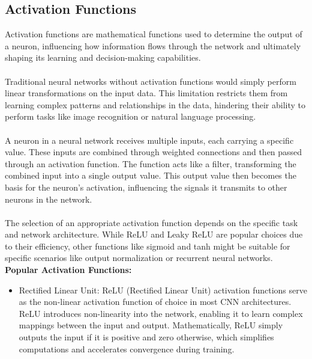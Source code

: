\documentclass{article}
\begin{document}
\subsection{Activation Functions}
Activation functions are mathematical functions used to determine the output of a neuron, influencing how information flows through the network and ultimately shaping its learning and decision-making capabilities.\\\\
Traditional neural networks without activation functions would simply perform linear transformations on the input data. This limitation restricts them from learning complex patterns and relationships in the data, hindering their ability to perform tasks like image recognition or natural language processing.\\\\
A neuron in a neural network receives multiple inputs, each carrying a specific value. These inputs are combined through weighted connections and then passed through an activation function. The function acts like a filter, transforming the combined input into a single output value. This output value then becomes the basis for the neuron's activation, influencing the signals it transmits to other neurons in the network.\\\\
The selection of an appropriate activation function depends on the specific task and network architecture. While ReLU and Leaky ReLU are popular choices due to their efficiency, other functions like sigmoid and tanh might be suitable for specific scenarios like output normalization or recurrent neural networks.\newline\newline
\textbf{Popular Activation Functions:}\hfill\newline\\

\begin{itemize}
    \item[\ding{118}] Rectified Linear Unit:
          ReLU (Rectified Linear Unit) activation functions serve as the non-linear activation function of choice in most CNN architectures. ReLU introduces non-linearity into the network, enabling it to learn complex mappings between the input and output. Mathematically, ReLU simply outputs the input if it is positive and zero otherwise, which simplifies computations and accelerates convergence during training.
\end{itemize}
\end{document}

